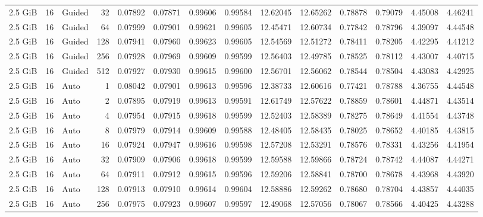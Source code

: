 \begin{table}[H]
\begin{adjustbox}{width=\textwidth, keepaspectratio}
\begin{tabular}{rrlrrrrrrrrrrr}
                    2.5 GiB & 16 & Guided & 32 & 0.07892 & 0.07871 & 0.99606 & 0.99584 & 12.62045 & 12.65262 & 0.78878 & 0.79079 & 4.45008 & 4.46241 \\
                    2.5 GiB & 16 & Guided & 64 & 0.07999 & 0.07901 & 0.99621 & 0.99605 & 12.45471 & 12.60734 & 0.77842 & 0.78796 & 4.39097 & 4.44548 \\
                    2.5 GiB & 16 & Guided & 128 & 0.07941 & 0.07960 & 0.99623 & 0.99605 & 12.54569 & 12.51272 & 0.78411 & 0.78205 & 4.42295 & 4.41212 \\
                    2.5 GiB & 16 & Guided & 256 & 0.07928 & 0.07969 & 0.99609 & 0.99599 & 12.56403 & 12.49785 & 0.78525 & 0.78112 & 4.43007 & 4.40715 \\
                    2.5 GiB & 16 & Guided & 512 & 0.07927 & 0.07930 & 0.99615 & 0.99600 & 12.56701 & 12.56062 & 0.78544 & 0.78504 & 4.43083 & 4.42925 \\
                    2.5 GiB & 16 & Auto & 1 & 0.08042 & 0.07901 & 0.99613 & 0.99596 & 12.38733 & 12.60616 & 0.77421 & 0.78788 & 4.36755 & 4.44548 \\
                    2.5 GiB & 16 & Auto & 2 & 0.07895 & 0.07919 & 0.99613 & 0.99591 & 12.61749 & 12.57622 & 0.78859 & 0.78601 & 4.44871 & 4.43514 \\
                    2.5 GiB & 16 & Auto & 4 & 0.07954 & 0.07915 & 0.99618 & 0.99599 & 12.52403 & 12.58389 & 0.78275 & 0.78649 & 4.41554 & 4.43748 \\
                    2.5 GiB & 16 & Auto & 8 & 0.07979 & 0.07914 & 0.99609 & 0.99588 & 12.48405 & 12.58435 & 0.78025 & 0.78652 & 4.40185 & 4.43815 \\
                    2.5 GiB & 16 & Auto & 16 & 0.07924 & 0.07947 & 0.99616 & 0.99598 & 12.57208 & 12.53291 & 0.78576 & 0.78331 & 4.43256 & 4.41954 \\
                    2.5 GiB & 16 & Auto & 32 & 0.07909 & 0.07906 & 0.99618 & 0.99599 & 12.59588 & 12.59866 & 0.78724 & 0.78742 & 4.44087 & 4.44271 \\
                    2.5 GiB & 16 & Auto & 64 & 0.07911 & 0.07912 & 0.99615 & 0.99596 & 12.59206 & 12.58841 & 0.78700 & 0.78678 & 4.43968 & 4.43920 \\
                    2.5 GiB & 16 & Auto & 128 & 0.07913 & 0.07910 & 0.99614 & 0.99604 & 12.58886 & 12.59262 & 0.78680 & 0.78704 & 4.43857 & 4.44035 \\
                    2.5 GiB & 16 & Auto & 256 & 0.07975 & 0.07923 & 0.99607 & 0.99597 & 12.49068 & 12.57056 & 0.78067 & 0.78566 & 4.40425 & 4.43288 \\

\end{tabular}
\end{adjustbox}
\end{table}
